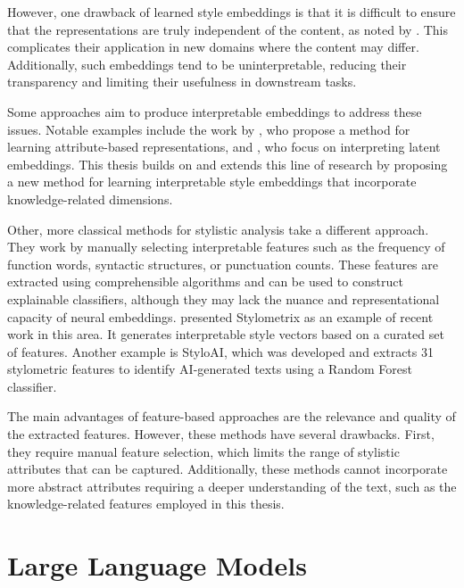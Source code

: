 However, one drawback of learned style embeddings is that it is difficult to ensure that the representations are truly independent of the content, as noted by \citet{wegmannSameAuthorJust2022}. This complicates their application in new domains where the content may differ. Additionally, such embeddings tend to be uninterpretable, reducing their transparency and limiting their usefulness in downstream tasks.

Some approaches aim to produce interpretable embeddings to address these issues. Notable examples include the work by \citet{patelLearningInterpretableStyle2023}, who propose a method for learning attribute-based representations, and \citet{alshomaryLatentSpaceInterpretation2024}, who focus on interpreting latent embeddings. This thesis builds on and extends this line of research by proposing a new method for learning interpretable style embeddings that incorporate knowledge-related dimensions.

Other, more classical methods for stylistic analysis take a different approach. They work by manually selecting interpretable features such as the frequency of function words, syntactic structures, or punctuation counts. These features are extracted using comprehensible algorithms and can be used to construct explainable classifiers, although they may lack the nuance and representational capacity of neural embeddings.
\citet{okulskaStyloMetrixOpensourceMultilingual2023} presented Stylometrix as an example of recent work in this area. It generates interpretable style vectors based on a curated set of features. Another example is StyloAI, which was developed \citet{oparaStyloAIDistinguishingAIgenerated2024} and extracts 31 stylometric features to identify AI-generated texts using a Random Forest classifier.

The main advantages of feature-based approaches are the relevance and quality of the extracted features. However, these methods have several drawbacks. First, they require manual feature selection, which limits the range of stylistic attributes that can be captured. Additionally, these methods cannot incorporate more abstract attributes requiring a deeper understanding of the text, such as the knowledge-related features employed in this thesis.

\section{Large Language Models}
\label{sec:background:llm}

